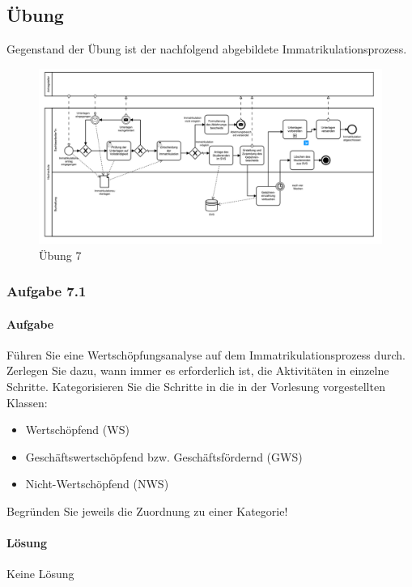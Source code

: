 \subsection{Übung}
Gegenstand der Übung ist der nachfolgend abgebildete Immatrikulationsprozess.

\begin{figure}[h]
    \centering
    \includegraphics[width=\textwidth]{image/Uebung7.png}
    \caption{Übung 7}
    \label{fig:Uebung7}
\end{figure}

\subsubsection*{Aufgabe 7.1}
    \paragraph*{Aufgabe}
        Führen Sie eine Wertschöpfungsanalyse auf dem Immatrikulationsprozess durch. Zerlegen Sie dazu, wann immer es erforderlich ist, die Aktivitäten in einzelne Schritte. Kategorisieren Sie die Schritte in die in der Vorlesung vorgestellten Klassen:

        \begin{itemize}
            \item Wertschöpfend (WS)
            \item Geschäftswertschöpfend bzw. Geschäftsfördernd (GWS)
            \item Nicht-Wertschöpfend (NWS)
        \end{itemize}

        Begründen Sie jeweils die Zuordnung zu einer Kategorie!

    \paragraph*{Lösung}
        Keine Lösung

